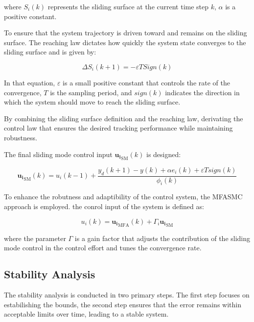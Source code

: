 \documentclass[journal,onecolumn]{IEEEtran}
\begin{document}
where \(S_i(k)\) represents the sliding surface at the current time step \(k\), \(\alpha\) is a positive constant.

To ensure that the system trajectory is driven toward and remains on the sliding surface. The reaching law dictates how quickly the system state converges to the sliding surface and is given by:

\begin{equation}
    \label{model eq:reaching_law}
    \Delta S_i(k+1) = - \varepsilon T Sign(k) 
\end{equation}

In that equation, \(\varepsilon\) is a small positive constant that controls the rate of the convergence, \(T\) is the sampling period, and \(sign(k)\) indicates the direction in which the system should move to reach the sliding surface.

By combining the sliding surface definition and the reaching law, derivating the control law that ensures the desired tracking performance while maintaining robustness.

The final sliding mode control input \(\mathbf{u_i}_{\text{SM}}(k)\) is designed:

\begin{equation}
    \label{model eq:smc}
    \mathbf{u_i}_{\text{SM}}(k) = u_i(k-1) + \frac{y_d(k+1)-y(k) + \alpha e_i(k) + \varepsilon T sign(k)}{\phi_i(k)}
\end{equation}

To enhance the robutness and adaptibility of the control system, the MFASMC approach is employed.  the conrol input of the system is defined as:

\begin{equation}
    \label{model eq:mfasmc}
    u_i(k) = \mathbf{u_i}_{\text{MFA}}(k) + \Gamma_i \mathbf{u_i}_{\text{SM}}
\end{equation}

where the parameter \(\Gamma\) is a gain factor that adjusts the contribution of the sliding mode control in the control effort and tunes the convergence rate.

\subsection{Stability Analysis}

The stability analysis is conducted in two primary steps. The first step focuses on estabilishing the bounds, the second step ensures that the error remains within acceptable limits over time, leading to a stable system.
\end{document}
